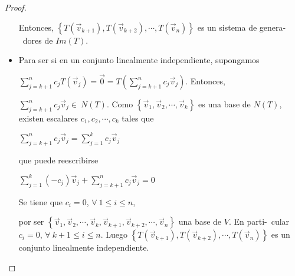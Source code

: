 \begin{corollary}
\begin{proof}
\begin{itemize}
    Entonces, 
    $ \left\{T(\vec{v}_{k+1}),T(\vec{v}_{k+2}),\cdots, T(\vec{v}_n )   \right\}$  es un sistema de genera-\ dores de $Im(T)$.
    
    
   \bigskip 
    
    \item 
    Para ser si en un conjunto linealmente independiente, supongamos 
    
    $ \sum_{j=k+1}^n  c_j T(\vec{v}_j ) = \vec{0}=    T( \sum_{j=k+1}^n   c_j \vec{v}_j )    $. Entonces,
    
    $ \sum_{j=k+1}^n   c_j \vec{v}_j \in ~ N(T) $.  Como $ \left\{\vec{v}_1,\vec{v}_2,\cdots, \vec{v}_k\right\}$ es una base de $N(T)$, existen escalares $c_1, c_2, \cdots, c_k$ tales que 
    
    \bigskip
    
    $ \sum_{j=k+1}^n   c_j \vec{v}_j =   \sum_{j=1}^k   c_j \vec{v}_j  $

     \bigskip
\noindent
    que puede reescribirse
    
    \bigskip
    
    $    \sum_{j=1}^k  (- c_j)  \vec{v}_j + \sum_{j=k+1}^n   c_j \vec{v}_j = 0$
    
    
    \bigskip
    
Se tiene que $c_i=0$, $ \forall  ~ 1 \le i \le n$, 

por ser $ \left\{\vec{v}_1,\vec{v}_2,\cdots, \vec{v}_k, \vec{v}_{k+1},\vec{v}_{k+2},\cdots, \vec{v}_n    \right\}$  una base de $V$. En parti-\ cular $c_i=0$, $ \forall  ~  k+1 \le i \le n$. Luego $ \left\{T(\vec{v}_{k+1}),T(\vec{v}_{k+2}),\cdots, T(\vec{v}_n )   \right\}$ es un conjunto linealmente independiente.   
\end{itemize}
\end{proof}
\end{corollary}
\bigskip

